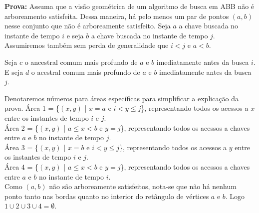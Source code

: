\textbf{Prova:} Assuma que a visão geométrica de um algoritmo de busca em ABB não é arboreamento satisfeita. Dessa maneira, há pelo menos um par de pontos $(a,b)$ nesse conjunto que não é arboreamente satisfeito. Seja $a$ a chave buscada no instante de tempo $i$ e seja $b$ a chave buscada no instante de tempo $j$. Assumiremos também sem perda de generalidade que $i < j$ e $a < b$.

Seja $c$ o ancestral comum mais profundo de $a$ e $b$ imediatamente antes da busca $i$. E seja $d$ o acestral comum mais profundo de $a$ e $b$ imediatamente antes da busca $j$.

Denotaremos números para áreas específicas para simplificar a explicação da prova. 
Área 1 = \{$(x,y)$ | $x = a$ e $i < y \leq j$\}, representando todos os acessos a $x$ entre os instantes de tempo $i$ e $j$. \\
Área 2 = \{$(x,y)$ | $a \leq x < b$ e $y = j$\}, representando todos os acessos a chaves entre $a$ e $b$ no instante de tempo $j$. \\
Área 3 = \{$(x,y)$ | $x = b$ e $i < y \leq j$\}, representando todos os acessos a $y$ entre os instantes de tempo $i$ e $j$. \\
Área 4 = \{$(x,y)$ | $a \leq x < b$ e $y = j$\}, representando todos os acessos a chaves entre $a$ e $b$ no instante de tempo $i$. \\

Como $(a,b)$ não são arboreamente satisfeitos, nota-se que não há nenhum ponto tanto nas bordas quanto no interior do retângulo de vértices $a$ e $b$. Logo $1 \cup 2 \cup 3 \cup 4 = \emptyset$.

